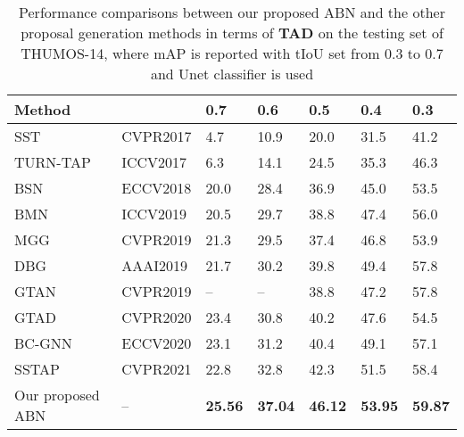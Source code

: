\documentclass{ieeeaccess}
\begin{document}
\begin{table*}[ht]
\centering
\caption{Performance comparisons between our proposed ABN and the other proposal generation methods in terms of \textbf{TAD} on the testing set of THUMOS-14, where mAP is reported with tIoU set from 0.3 to 0.7 and Unet classifier is used}
\begin{tabular}{l l l l l l l} 
\hline
Method &  & 0.7   & 0.6  & 0.5   & 0.4   & 0.3 \\ \hline
\hline
SST \cite{SST_CVPR2017}    & CVPR2017  &  4.7 & 10.9 & 20.0 & 31.5 & 41.2 \\ 
TURN-TAP\cite{anchor_3}  & ICCV2017 & 6.3 & 14.1 & 24.5 & 35.3 & 46.3 \\
BSN \cite{lin2018bsn}     & ECCV2018 & 20.0 & 28.4 & 36.9 & 45.0 & 53.5 \\ 
BMN \cite{bmn} & ICCV2019 & 20.5 & 29.7 & 38.8 & 47.4 & 56.0 \\
MGG \cite{liu2019multi} & CVPR2019 & 21.3 & 29.5 & 37.4 & 46.8 & 53.9\\
DBG \cite{dbg} & AAAI2019 & 21.7 & 30.2 & 39.8 & 49.4 & 57.8\\
GTAN~\cite{gtan_cvpr2019}  & CVPR2019 & -- & -- & 38.8 & 47.2 & 57.8 \\
GTAD \cite{xu2020gtad} & CVPR2020 & 23.4 & 30.8 & 40.2 & 47.6 & 54.5\\
BC-GNN~\cite{bai2020boundary} & ECCV2020 & 23.1 & 31.2 &  40.4 & 49.1 & 57.1 \\

SSTAP \cite{wang2021self}& CVPR2021 & 22.8 & 32.8 & 42.3 & 51.5 & 58.4 \\
\hline
Our proposed ABN & -- & \textbf{25.56} & \textbf{37.04}& \textbf{46.12} & \textbf{53.95}&\textbf{59.87}  \\ \hline
\end{tabular}
\label{action_detection_thumos}
\end{table*}
\end{document}
